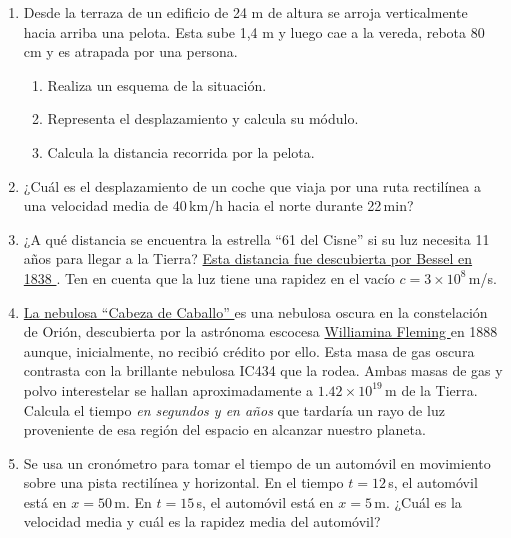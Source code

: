 \begin{enumerate}
\item Desde la terraza de un edificio de 24 m de altura se arroja verticalmente hacia arriba una pelota. Esta sube 1,4 m y luego cae a la vereda, rebota 80 cm y es atrapada por una persona.
  \begin{enumerate}
  \item Realiza un esquema de la situación.
  \item Representa el desplazamiento y calcula su módulo.
  \item Calcula la distancia recorrida por la pelota.
  \end{enumerate}
    
  \item ¿Cuál es el desplazamiento de un coche que viaja por una ruta rectilínea a una velocidad media de 40\,km/h hacia el norte durante 22\,min?

  \item ¿A qué distancia se encuentra  la estrella  ``61 del Cisne'' si su luz necesita 11 años para llegar a la Tierra? \href{http://www.elmundo.es/elmundo/2009/06/08/ciencia/1244457000.html}{Esta distancia fue descubierta por Bessel en 1838 \faExternalLink}. Ten en cuenta que la luz tiene una rapidez en el vacío  $c = 3 \times 10^8$\,m/s.

  \item \href{https://www.youtube.com/watch?v=ObuWeZNdem4}{La nebulosa ``Cabeza de Caballo'' \faExternalLink} es una nebulosa oscura en la constelación de Orión, descubierta por la astrónoma escocesa \href{https://elpais.com/elpais/2015/10/28/ciencia/1446051155_519282.html}{Williamina Fleming \faExternalLink} en 1888 aunque, inicialmente, no recibió crédito por ello. Esta masa de gas oscura contrasta con la brillante nebulosa IC434 que la rodea. Ambas masas de gas y polvo interestelar se hallan aproximadamente a $1.42\times 10^{19}$\,m de la Tierra. Calcula el tiempo {\it en segundos y en años} que tardaría un rayo de luz proveniente de esa región del espacio en alcanzar nuestro planeta.
  
  \item Se usa un cronómetro para tomar el tiempo de un automóvil en movimiento sobre una pista rectilínea y horizontal. En el tiempo $t =  12$\,s, el automóvil está en $x =  50$\,m. En  $t =  15$\,s, el automóvil está en $x =  5$\,m. ¿Cuál es la velocidad media y cuál es la rapidez media del automóvil?
  

\end{enumerate}
